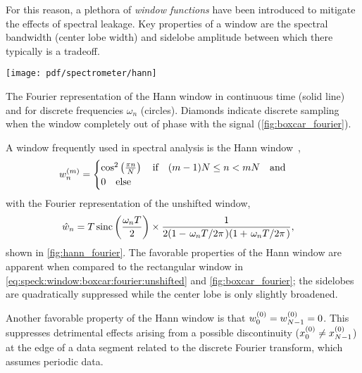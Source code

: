 For this reason, a plethora of \emph{window functions} have been introduced to mitigate the effects of spectral leakage.
Key properties of a window are the spectral bandwidth (center lobe width) and sidelobe amplitude between which there typically is a tradeoff.
\begin{marginfigure}
    \centering
    \texttt{[image: pdf/spectrometer/hann]}
    \caption{
        The Fourier representation of the Hann window in continuous time (solid line) and for discrete frequencies $\omega_n$ (circles).
        Diamonds indicate discrete sampling when the window completely out of phase with the signal (\cf \cref{fig:boxcar_fourier}).
    }
    \label{fig:hann_fourier}
\end{marginfigure}
A window frequently used in spectral analysis is the Hann window~\cite{Nuttall1981},
\begin{align}\label{eq:speck:window:hann}
    w_n\gth{m} =
    \begin{cases}
        \cos^2\left(\frac{\pi n}{N}\right)\qif (m - 1)N\leq n < mN\qand \\
        0\qelse
    \end{cases}
\end{align}
with the Fourier representation of the unshifted window,
\begin{align}\label{eq:speck:window:hann:fourier_unshifted}
    \hat{w}_n &=  T\sinc\left(\frac{\omega_n T}{2}\right)\times
                    \frac{1}{2(1 - \flatfrac{\omega_n T}{2\pi})(1 + \flatfrac{\omega_n T}{2\pi})},
\end{align}
shown in \cref{fig:hann_fourier}.
The favorable properties of the Hann window are apparent when compared to the rectangular window in \cref{eq:speck:window:boxcar:fourier:unshifted} and \cref{fig:boxcar_fourier}; the sidelobes are quadratically suppressed while the center lobe is only slightly broadened.

Another favorable property of the Hann window is that $w_0^{(0)} = w_{N-1}^{(0)} = 0$.
This suppresses detrimental effects arising from a possible discontinuity ($x_0^{(0)}\neq x_{N-1}^{(0)}$) at the edge of a data segment related to the discrete Fourier transform, which assumes periodic data.

